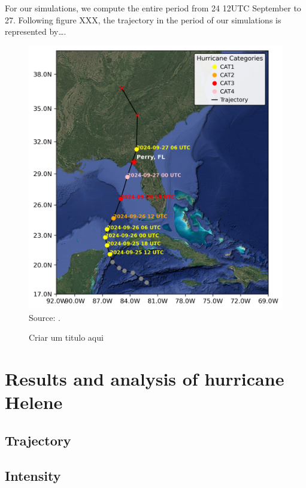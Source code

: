 For our simulations, we compute the entire period from 24 12UTC September to 27. Following figure XXX, the trajectory in the period of our simulations is represented by….

\begin{figure}[!ht]
	\centering
	\caption{Criar um titulo aqui} %
	\includegraphics[width=\textwidth]{docs/figuras/chapter6/HELENE_map_with_cat_path.png} 
	\vspace{0.5em}
	Source: .  %
	\label{fig:synoptic} %
\end{figure}



\section{Results and analysis of hurricane Helene}

\subsection{Trajectory}

\subsection{Intensity}

